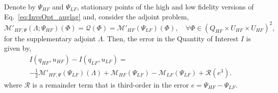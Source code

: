 \begin{theorem}
Denote by $\Psi_{HF}$ and $\Psi_{LF}$, stationary points of the high and low fidelity versions of Eq.~\eqref{eq:InvsOpt_auglag} and, consider the adjoint problem,
%
\begin{equation}
\label{eq:superAdjEq}
\mathcal{M}'_{HF,\Psi}(\Lambda;\Psi_{HF})(\Phi)=\mathcal{Q}(\Phi)=\mathcal M'_{HF}(\Psi_{LF})(\Phi),\quad\forall\Phi\in(Q_{HF}\times U_{HF}\times U_{HF})^2,
\end{equation}
%
for the supplementary adjoint $\Lambda$. Then, the error in the Quantity of Interest $I$ is given by,
%
\begin{multline}
\label{eq:finErrExp}
I(q_{HF},u_{HF})-I(q_{LF},u_{LF})=\\-\frac{1}{2}\mathcal{M}'_{HF,\Psi}(\Psi_{LF})(\Lambda)+\mathcal M_{HF}(\Psi_{LF})-\mathcal M_{LF}(\Psi_{LF})+\mathcal{R}(e^3).
\end{multline}
%
where $\mathcal{R}$ is a remainder term that is third-order in the error $e=\Psi_{HF}-\Psi_{LF}$.
\end{theorem}
%
